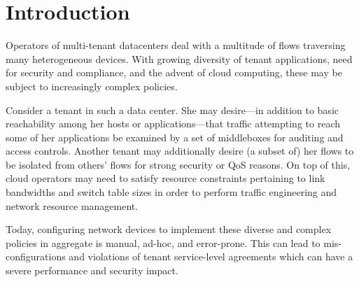 \section{Introduction}

Operators of multi-tenant datacenters deal with a multitude of
flows traversing many heterogeneous devices. With growing
diversity of tenant applications, need for security and compliance,
and the advent of cloud computing, these may be subject to
increasingly complex policies.

Consider a tenant in such a data center. She may desire---in addition
to basic reachability among her hosts or applications---that traffic
attempting to reach some of her applications be examined by a set of
middleboxes for auditing and access controls. Another tenant may
additionally desire (a subset of) her flows to be isolated from
others' flows for strong security or QoS reasons. On top of this,
cloud operators may need to satisfy resource constraints pertaining to
link bandwidths and switch table sizes in order to perform traffic
engineering and network resource management.

Today, configuring network devices to implement these diverse
and complex policies in aggregate is manual, ad-hoc, and error-prone. 
This can lead to mis-configurations and violations of tenant
service-level agreements which can have a severe performance and
security impact.



